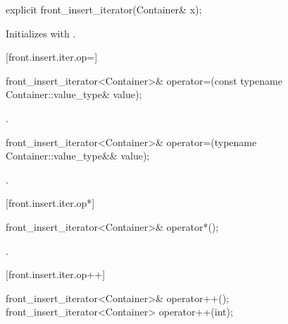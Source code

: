 %

\begin{itemdecl}
explicit front_insert_iterator(Container& x);
\end{itemdecl}

\begin{itemdescr}
\pnum
\effects
Initializes
with .
\end{itemdescr}

[front.insert.iter.op=]{}

%
\begin{itemdecl}
front_insert_iterator<Container>&
  operator=(const typename Container::value_type& value);
\end{itemdecl}

\begin{itemdescr}
\pnum
\effects
{}

\pnum
\returns
{}.
\end{itemdescr}

%
\begin{itemdecl}
front_insert_iterator<Container>&
  operator=(typename Container::value_type&& value);
\end{itemdecl}

\begin{itemdescr}
\pnum
\effects
{}

\pnum
\returns
{}.
\end{itemdescr}

[front.insert.iter.op*]{}

%
\begin{itemdecl}
front_insert_iterator<Container>& operator*();
\end{itemdecl}

\begin{itemdescr}
\pnum
\returns
{}.
\end{itemdescr}

[front.insert.iter.op++]{}

%
\begin{itemdecl}
front_insert_iterator<Container>& operator++();
front_insert_iterator<Container>  operator++(int);
\end{itemdecl}

